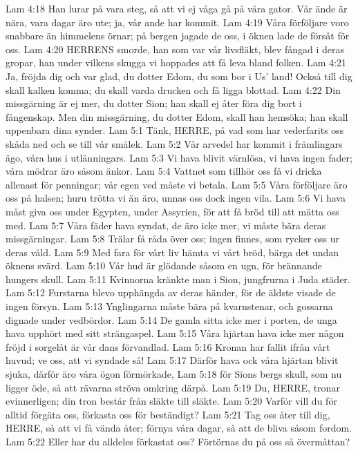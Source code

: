Lam 4:18  Han lurar på vara steg, så att vi ej våga gå på våra gator. Vår ände är nära, vara dagar äro ute; ja, vår ande har kommit.
Lam 4:19  Våra förföljare voro snabbare än himmelens örnar; på bergen jagade de oss, i öknen lade de försåt för oss.
Lam 4:20  HERRENS smorde, han som var vår livsfläkt, blev fångad i deras gropar, han under vilkens skugga vi hoppades att få leva bland folken.
Lam 4:21  Ja, fröjda dig och var glad, du dotter Edom, du som bor i Us' land! Också till dig skall kalken komma; du skall varda drucken och få ligga blottad.
Lam 4:22  Din missgärning är ej mer, du dotter Sion; han skall ej åter föra dig bort i fångenskap. Men din missgärning, du dotter Edom, skall han hemsöka; han skall uppenbara dina synder.
Lam 5:1  Tänk, HERRE, på vad som har vederfarits oss skåda ned och se till vår smälek.
Lam 5:2  Vår arvedel har kommit i främlingars ägo, våra hus i utlänningars.
Lam 5:3  Vi hava blivit värnlösa, vi hava ingen fader; våra mödrar äro såsom änkor.
Lam 5:4  Vattnet som tillhör oss få vi dricka allenast för penningar; vår egen ved måste vi betala.
Lam 5:5  Våra förföljare äro oss på halsen; huru trötta vi än äro, unnas oss dock ingen vila.
Lam 5:6  Vi hava måst giva oss under Egypten, under Assyrien, för att få bröd till att mätta oss med.
Lam 5:7  Våra fäder hava syndat, de äro icke mer, vi måste bära deras missgärningar.
Lam 5:8  Trälar få råda över oss; ingen finnes, som rycker oss ur deras våld.
Lam 5:9  Med fara för vårt liv hämta vi vårt bröd, bärga det undan öknens svärd.
Lam 5:10  Vår hud är glödande såsom en ugn, för brännande hungers skull.
Lam 5:11  Kvinnorna kränkte man i Sion, jungfrurna i Juda städer.
Lam 5:12  Furstarna blevo upphängda av deras händer, för de äldste visade de ingen försyn.
Lam 5:13  Ynglingarna måste bära på kvarnstenar, och gossarna dignade under vedbördor.
Lam 5:14  De gamla sitta icke mer i porten, de unga hava upphört med sitt strängaspel.
Lam 5:15  Våra hjärtan hava icke mer någon fröjd i sorgelåt är vår dans förvandlad.
Lam 5:16  Kronan har fallit ifrån vårt huvud; ve oss, att vi syndade så!
Lam 5:17  Därför hava ock våra hjärtan blivit sjuka, därför äro våra ögon förmörkade,
Lam 5:18  för Sions bergs skull, som nu ligger öde, så att rävarna ströva omkring därpå.
Lam 5:19  Du, HERRE, tronar evinnerligen; din tron består från släkte till släkte.
Lam 5:20  Varför vill du för alltid förgäta oss, förkasta oss för beständigt?
Lam 5:21  Tag oss åter till dig, HERRE, så att vi få vända åter; förnya våra dagar, så att de bliva såsom fordom.
Lam 5:22  Eller har du alldeles förkastat oss? Förtörnas du på oss så övermåttan?


